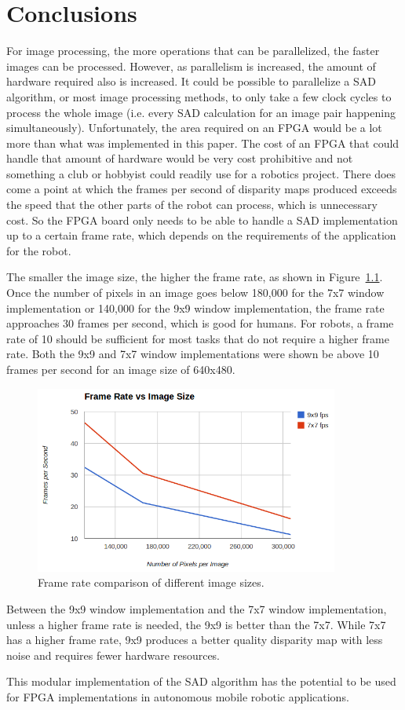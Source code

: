 \chapter{Conclusions}
\label{sec:concl}

For image processing, the more operations that can be parallelized, the faster images can be processed. However, as parallelism is increased, the amount of hardware required also is increased. It could be possible to parallelize a SAD algorithm, or most image processing methods, to only take a few clock cycles to process the whole image (i.e. every SAD calculation for an image pair happening simultaneously). Unfortunately, the area required on an FPGA would be a lot more than what was implemented in this paper. The cost of an FPGA that could handle that amount of hardware would be very cost prohibitive and not something a club or hobbyist could readily use for a robotics project. There does come a point at which the frames per second of disparity maps produced exceeds the speed that the other parts of the robot can process, which is unnecessary cost. So the FPGA board only needs to be able to handle a SAD implementation up to a certain frame rate, which depends on the requirements of the application for the robot.

The smaller the image size, the higher the frame rate, as shown in Figure~\ref{fig:frameRate}. Once the number of pixels in an image goes below 180,000 for the 7x7 window implementation or 140,000 for the 9x9 window implementation, the frame rate approaches 30 frames per second, which is good for humans. For robots, a frame rate of 10 should be sufficient for most tasks that do not require a higher frame rate. Both the 9x9 and 7x7 window implementations were shown be above 10 frames per second for an image size of 640x480.

\begin{figure}
	\begin{center}
		\includegraphics[width=100mm]{figures/frameRate.png}
		\captionfonts
		\caption{Frame rate comparison of different image sizes.}
		\label{fig:frameRate}
	\end{center}
\end{figure}

Between the 9x9 window implementation and the 7x7 window implementation, unless a higher frame rate is needed, the 9x9 is better than the 7x7. While 7x7 has a higher frame rate, 9x9 produces a better quality disparity map with less noise and requires fewer hardware resources.

This modular implementation of the SAD algorithm has the potential to be used for FPGA implementations in autonomous mobile robotic applications.